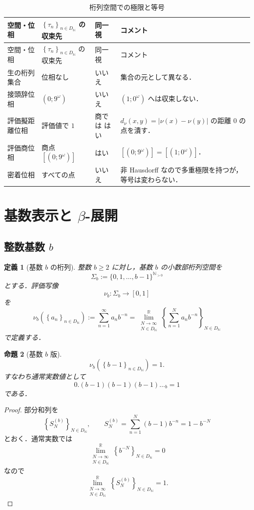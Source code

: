 \documentclass[a4paper,11pt]{ltjsarticle}
\theoremstyle{jpdef}
\newtheorem{definition}{定義}[section]
\theoremstyle{jpthm}
\newtheorem{proposition}[definition]{命題}
\newcommand{\N}{\mathbb{N}}
\newcommand{\R}{\mathbb{R}}
\newcommand{\Ns}{\N_{>0}}
\newcommand{\DN}{D_{\N}}
\newcommand{\seq}[2]{\left\{#1\right\}_{#2}}
\begin{document}
\begin{longtable}{L{34mm}L{40mm}C{18mm}L{59mm}}
\caption{桁列空間での極限と等号}\label{tab:digit}\\
\toprule
空間・位相 & \(\seq{\tau_n}{n\in\DN}\) の収束先 & 同一視 & コメント\\
\midrule
\endfirsthead
\toprule
空間・位相 & \(\seq{\tau_n}{n\in\DN}\) の収束先 & 同一視 & コメント\\
\midrule
\endhead
生の桁列集合 & 位相なし & いいえ & 集合の元として異なる．\\
接頭辞位相 & \((0;9^\omega)\) & いいえ & \((1;0^\omega)\) へは収束しない．\\
評価擬距離位相 & 評価値で \(1\) & 商では はい & \(d_\nu(x,y)=|\nu(x)-\nu(y)|\) の距離 \(0\) の点を潰す．\\
評価商位相 & 商点 \([(0;9^\omega)]\) & はい & \([(0;9^\omega)]=[(1;0^\omega)]\)．\\
密着位相 & すべての点 & いいえ & 非 Hausdorff なので多重極限を持つが，等号は変わらない．\\
\bottomrule
\end{longtable}

\section{基数表示と \texorpdfstring{\(\beta\)}{beta}-展開}

\subsection{整数基数 \texorpdfstring{\(b\)}{b}}

\begin{definition}[基数 \(b\) の桁列]
整数 \(b\ge2\) に対し，基数 \(b\) の小数部桁列空間を
\[
  \Sigma_b:=\{0,1,\ldots,b-1\}^{\Ns}
\]
とする．評価写像
\[
  \nu_b:\Sigma_b\to[0,1]
\]
を
\[
  \nu_b(\seq{a_n}{n\in\DN})
  :=\sum_{n=1}^{\infty}a_nb^{-n}
  =\lim_{\substack{N\to\infty\\ N\in\DN}}^{\R}\seq{\sum_{n=1}^{N}a_nb^{-n}}{N\in\DN}
\]
で定義する．
\end{definition}

\begin{proposition}[基数 \(b\) 版]
\[
  \nu_b(\seq{b-1}{n\in\DN})=1.
\]
すなわち通常実数値として
\[
  0.(b-1)(b-1)(b-1)\ldots_b=1
\]
である．
\end{proposition}

\begin{proof}
部分和列を
\[
  \seq{S_N^{(b)}}{N\in\DN},
  \qquad
  S_N^{(b)}=\sum_{n=1}^{N}(b-1)b^{-n}=1-b^{-N}
\]
とおく．通常実数では
\[
  \lim_{\substack{N\to\infty\\ N\in\DN}}^{\R}\seq{b^{-N}}{N\in\DN}=0
\]
なので
\[
  \lim_{\substack{N\to\infty\\ N\in\DN}}^{\R}\seq{S_N^{(b)}}{N\in\DN}=1.
\]
\end{proof}
\end{document}
